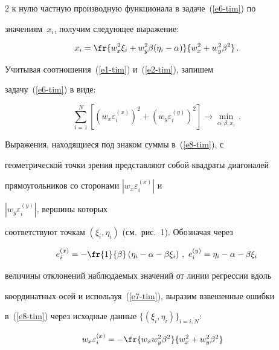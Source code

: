 \begin{multicols}{2}
к нулю частную производную функционала в задаче~(\ref{e6-tim}) по

значениям~$x_i$, получим следующее выражение:

\begin{equation}

x_i = \fr{w^2_x \xi_i +w^2_y \beta (\eta_i-\alpha)}{w_x^2 + w_y^2 \beta^2}\,.

\label{e7-tim}

\end{equation}



  Учитывая соотношения~(\ref{e1-tim}) и~(\ref{e2-tim}), запишем

задачу~(\ref{e6-tim}) в виде:

  \begin{equation}

  \sum\limits_{i=1}^N \left[ \left( w_x \varepsilon_i^{(x)}\right)^2 +\left( w_y

\varepsilon_i^{(y)}\right)^2 \right] \to \min\limits_{\alpha,\beta, x_i}\,.

  \label{e8-tim}

  \end{equation}



  Выражения, находящиеся под знаком суммы в~(\ref{e8-tim}), с

геометрической точки зрения представляют собой квадраты диагоналей

прямоугольников со сторонами $\left\vert w_x \varepsilon_i^{(x)}\right\vert$ и

$\left\vert w_y \varepsilon_i^{(y)}\right\vert$, вершины которых

соответствуют точкам $(\xi_i,\eta_i)$ (см.\ рис.~1). Обозначая через

  $$

  e_i^{(x)}= -\fr{1}{\beta}\left( \eta_i -\alpha-\beta\xi_i\right)\,,\ e_i^{(y)}

=\eta_i-\alpha-\beta\xi_i

  $$

величины отклонений наблюдаемых значений от линии регрессии вдоль

координатных осей и используя~(\ref{e7-tim}), выразим взвешенные ошибки

в~(\ref{e8-tim}) через исходные данные $\{ (\xi_i,\eta_i)\}_{i=\overline{i,N}}$:

\begin{align*}

w_x\varepsilon_i^{(x)}&= -\fr{w_x w_y^2\beta^2} {w_x^2+ w_y^2\beta^2}


\end{align*}
\end{multicols}

